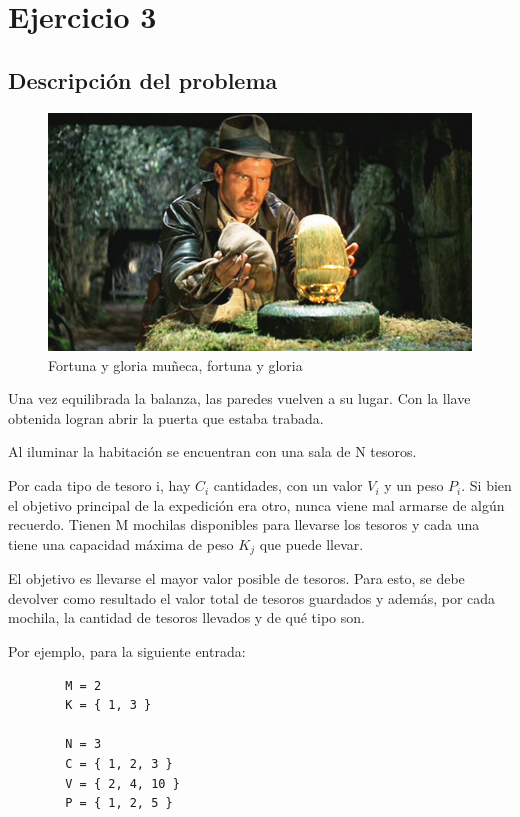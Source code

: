 \section{Ejercicio 3}
    \subsection{Descripción del problema}

		\begin{figure}[ht]
			\begin{center}
				\includegraphics[width=0.4\columnwidth]{imagenes/tesoros.jpg}
				\caption{Fortuna y gloria muñeca, fortuna y gloria}
			\end{center}
		\end{figure}

        Una vez equilibrada la balanza, las paredes vuelven a su lugar. Con la llave obtenida logran abrir la puerta que estaba trabada. \par
		Al iluminar la habitación se encuentran con una sala de N tesoros. \par
		Por cada tipo de tesoro i, hay $C_{i}$ cantidades, con un valor $V_{i}$ y un peso $P_{i}$. Si bien el objetivo principal de la expedición era otro, nunca viene mal armarse de algún recuerdo. 
		Tienen M mochilas disponibles para llevarse los tesoros y cada una tiene una capacidad máxima de peso $K_{j}$ que puede llevar. \par
		El objetivo es llevarse el mayor valor posible de tesoros. Para esto, se debe devolver como resultado el valor total de tesoros guardados y además, por cada mochila, la cantidad de tesoros llevados y de qué tipo son.

        Por ejemplo, para la siguiente entrada:
        
        \begin{verbatim}
        M = 2
        K = { 1, 3 }
        
        N = 3 
        C = { 1, 2, 3 }
        V = { 2, 4, 10 }
        P = { 1, 2, 5 }
        \end{verbatim}

